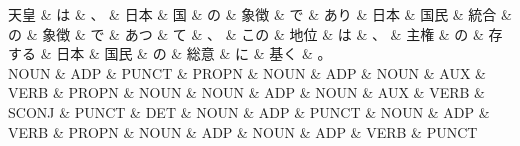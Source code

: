 \documentclass[tikz,border=5pt]{standalone}
\begin{document}
\small
\begin{dependency}[edge unit distance=12.0pt]
    \begin{deptext}[column sep=0.5em]
        天皇 \& は \& 、 \& 日本 \& 国 \& の \& 象徴 \& で \& あり \& 日本 \& 国民 \& 統合 \& の \& 象徴 \& で \& あつ \& て \& 、 \& この \& 地位 \& は \& 、 \& 主権 \& の \& 存する \& 日本 \& 国民 \& の \& 総意 \& に \& 基く \& 。\\
        NOUN \& ADP \& PUNCT \& PROPN \& NOUN \& ADP \& NOUN \& AUX \& VERB \& PROPN \& NOUN \& NOUN \& ADP \& NOUN \& AUX \& VERB \& SCONJ \& PUNCT \& DET \& NOUN \& ADP \& PUNCT \& NOUN \& ADP \& VERB \& PROPN \& NOUN \& ADP \& NOUN \& ADP \& VERB \& PUNCT\\
    \end{deptext}
\end{dependency}
\end{document}

